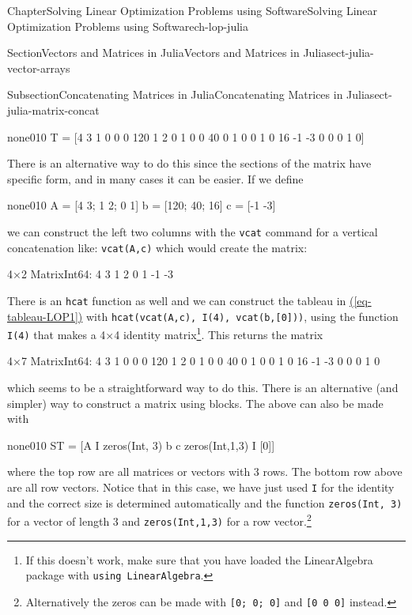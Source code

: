 \documentclass[oneside,10pt,]{book}
\newcommand{\xreffont}{\relax}
\newcommand{\mono}[1]{\texttt{#1}}
\numberwithin{equation}{section}
\begin{document}
\begin{chapterptx}{Chapter}{Solving Linear Optimization Problems using Software}{}{Solving Linear Optimization Problems using Software}{}{}{ch-lop-julia}
\begin{sectionptx}{Section}{Vectors and Matrices in Julia}{}{Vectors and Matrices in Julia}{}{}{sect-julia-vector-arrays}
\begin{subsectionptx}{Subsection}{Concatenating Matrices in Julia}{}{Concatenating Matrices in Julia}{}{}{sect-julia-matrix-concat}
\begin{program}{none}{0}{1}{0}
T = [4 3 1 0 0 0 120
    1 2 0 1 0 0 40
    0 1 0 0 1 0 16
   -1 -3 0 0 0 1   0]
\end{program}
There is an alternative way to do this since the sections of the matrix have specific form, and in many cases it can be easier. If we define%
\begin{program}{none}{0}{1}{0}
A = [4 3; 1 2; 0 1]
b = [120; 40; 16]
c = [-1 -3]
\end{program}
we can construct the left two columns with the \mono{vcat} command for a vertical concatenation like: \mono{vcat(A,c)} which would create the matrix:%
\par
%
\begin{codedisplay}
4×2 Matrix{Int64}:
 4   3
 1   2
 0   1
-1  -3
\end{codedisplay}
%
\par
There is an \mono{hcat} function as well and we can construct the tableau in \hyperref[eq-tableau-LOP1]{({\xreffont\ref{eq-tableau-LOP1}})} with \mono{hcat(vcat(A,c), I(4), vcat(b,[0]))}, using the function \mono{I(4)} that makes a 4×4 identity matrix\footnote{If this doesn't work, make sure that you have loaded the LinearAlgebra package with \mono{using LinearAlgebra}.\label{sect-julia-matrix-concat-8-5}}. This returns the matrix%
\par
%
\begin{codedisplay}
4×7 Matrix{Int64}:
 4   3  1  0  0  0  120
 1   2  0  1  0  0   40
 0   1  0  0  1  0   16
-1  -3  0  0  0  1    0
\end{codedisplay}
%
\par
which seems to be a straightforward way to do this. There is an alternative (and simpler) way to construct a matrix using blocks. The above can also be made with%
\begin{program}{none}{0}{1}{0}
ST = [A I zeros(Int, 3) b
  c zeros(Int,1,3) I [0]]
\end{program}
where the top row are all matrices or vectors with 3 rows. The bottom row above are all row vectors. Notice that in this case, we have just used \mono{I} for the identity and the correct size is determined automatically and the function \mono{zeros(Int, 3)} for a vector of length 3 and \mono{zeros(Int,1,3)} for a row vector.\footnote{Alternatively the zeros can be made with \mono{[0; 0; 0]} and \mono{[0 0 0]} instead.\label{sect-julia-matrix-concat-12-4}}%
\end{subsectionptx}
%
%
\typeout{************************************************}
\typeout{************************************************}

\end{sectionptx}
\end{chapterptx}
\end{document}
